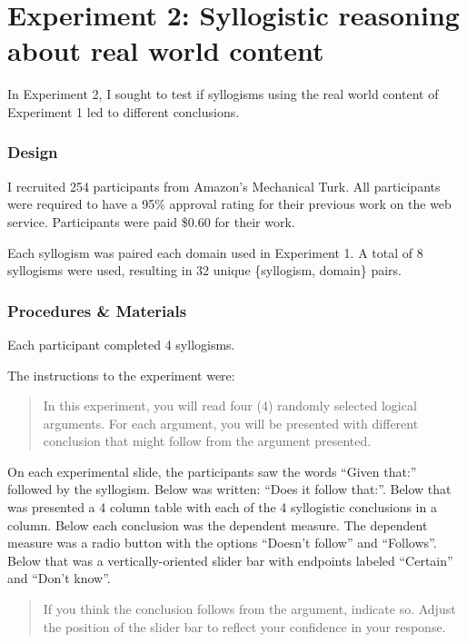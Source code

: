 \documentclass{llncs} %
\begin{document}
\section{Experiment 2: Syllogistic reasoning about real world content}

In Experiment 2,  I sought to test if syllogisms using the real world content of Experiment 1 led to different conclusions.

\subsubsection{Design}

I recruited 254 participants from Amazon's Mechanical Turk. All participants were required to have a 95\% approval rating for their previous work on the web service. Participants were paid \$0.60 for their work.

Each syllogism was paired each domain used in Experiment 1. A total of 8 syllogisms were used, resulting in 32 unique \{syllogism, domain\} pairs.

\subsubsection{Procedures \& Materials}

Each participant completed 4 syllogisms. 

The instructions to the experiment were:

\begin{quotation}
In this experiment, you will read four (4) randomly selected logical arguments. For each argument, you will be presented with different conclusion that might follow from the argument presented.
\end{quotation}

On each experimental slide, the participants saw the words ``Given that:'' followed by the syllogism. Below was written: ``Does it follow that:''. Below that was presented a 4 column table with each of the 4 syllogistic conclusions in a column. Below each conclusion was the dependent measure. The dependent measure was a radio button with the options ``Doesn't follow'' and ``Follows''. Below that was a vertically-oriented slider bar with endpoints labeled ``Certain'' and ``Don't know''. 

\begin{quotation}
If you think the conclusion follows from the argument, indicate so. Adjust the position of the slider bar to reflect your confidence in your response.
\end{quotation}
\end{document}
